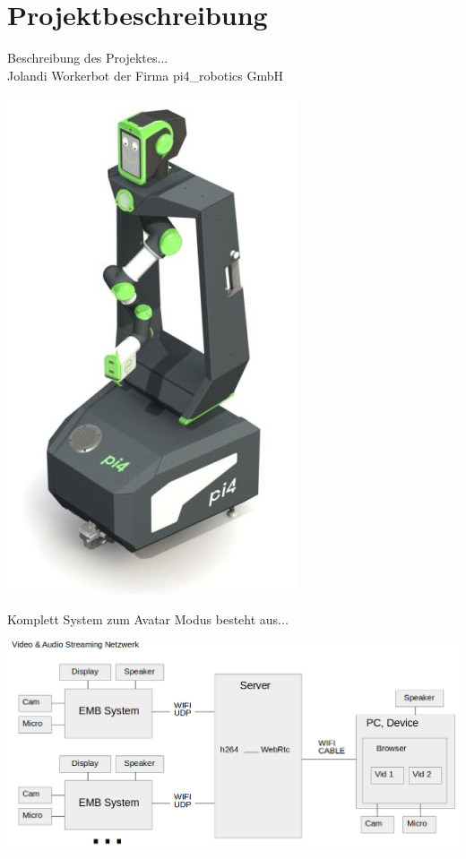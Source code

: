 \newpage
\section{Projektbeschreibung}

Beschreibung des Projektes...\\

Jolandi Workerbot der Firma pi4\_robotics GmbH\\

\begin{minipage}{\textwidth}
    \begin{center}
        
        \includegraphics[scale=0.5]{img/jolandi.jpg} 
    \end{center}
\end{minipage}

 
Komplett System zum Avatar Modus besteht aus...\\

\begin{minipage}{\textwidth}
    \begin{center}
        
        \includegraphics[scale=0.4]{img/schemaproj.png} 
    \end{center}
\end{minipage}


